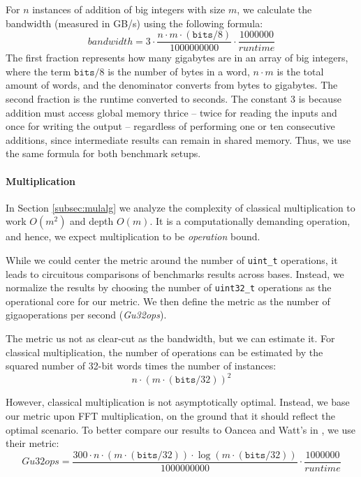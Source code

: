 For $n$ instances of addition of big integers with size $m$, we calculate the
bandwidth (measured in GB/s) using the following formula:
\begin{equation}
    \label{eq:bandwidth}
    \mathit{bandwidth} = 3 \cdot \dfrac{n \cdot m \cdot (\mathtt{bits}/8)}{1000000000} \cdot \dfrac{1000000}{\mathit{runtime}}
\end{equation}
The first fraction represents how many gigabytes are in an array of big
integers, where the term $\mathtt{bits} / 8$ is the number of bytes in a word,
$n\cdot m$ is the total amount of words, and the denominator converts from bytes to
gigabytes. The second fraction is the runtime converted to seconds. The constant
3 is because addition must access global memory thrice -- twice for reading the
inputs and once for writing the output -- regardless of performing one or ten
consecutive additions, since intermediate results can remain in shared
memory. Thus, we use the same formula for both benchmark setups.


\paragraph{Multiplication}
In Section \ref{subsec:mulalg} we analyze the complexity of classical
multiplication to work $O(m^2)$ and depth $O(m)$. It is a computationally
demanding operation, and hence, we expect multiplication to be
\textit{operation} bound.

While we could center the metric around the number of \texttt{uint\_t}
operations, it leads to circuitous comparisons of benchmarks results across
bases. Instead, we normalize the results by choosing the number of
\texttt{uint32\_t} operations as the operational core for our metric. We then
define the metric as the number of gigaoperations per second (\textit{Gu32ops}).

The metric us not as clear-cut as the bandwidth, but we can estimate it. For
classical multiplication, the number of operations can be estimated by the
squared number of 32-bit words times the number of instances:
\begin{equation}
  \label{eq:u32opsobs}
  {n \cdot (m \cdot (\mathtt{bits} / 32))^2}
\end{equation}

However, classical multiplication is not asymptotically optimal. Instead, we
base our metric upon FFT multiplication, on the ground that it should reflect
the optimal scenario. To better compare our results to Oancea and Watt's in
{}, we use their metric:
\begin{equation}
  \label{eq:u32ops}
  \mathit{Gu32ops} = \dfrac{300 \cdot n \cdot (m \cdot (\mathtt{bits} / 32)) \cdot \log (m \cdot (\mathtt{bits} / 32))}{1000000000} \cdot \dfrac{1000000}{\mathit{runtime}}
\end{equation}

